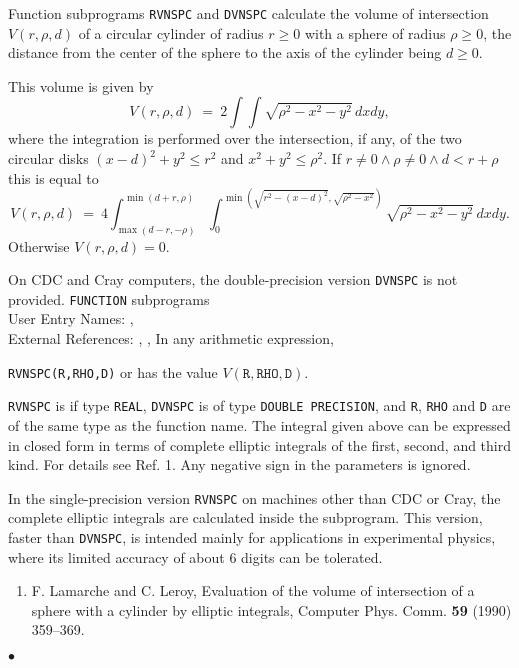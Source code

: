               
     
\Submitter{}                  
         \Revised{}
Function subprograms {\tt RVNSPC} and {\tt DVNSPC} calculate the volume
of intersection $V(r,\rho,d)$ of a circular cylinder of radius
$r \geq 0$ with a sphere of radius $\rho \geq 0$, the distance from
the center of the sphere to the axis of the cylinder being $d \geq 0$.
\par
This volume is given by
$$ V(r,\rho,d) \ = \ \displaystyle
2 \int\!\!\!\int \sqrt{\rho^2-x^2-y^2} \, dx dy, $$
where the integration is performed over the intersection, if any,
of the two circular disks $(x-d)^2 + y^2 \leq r^2$
and $x^2 + y^2 \leq \rho^2$.
If $r \neq 0 \wedge \rho \neq 0 \wedge d < r+\rho$ this is equal to
$$ V(r,\rho,d) \ = \ \displaystyle
4 \int_{\max(d-r,-\rho)}^{\min(d+r,\rho)}
\int_0^{\min \left( \sqrt{r^2-(x-d)^2},\sqrt{\rho^2-x^2} \right)}
\sqrt{\rho^2-x^2-y^2} \, dx dy. $$
Otherwise $V(r,\rho,d) = 0$.
\par
On CDC and Cray computers, the double-precision version {\tt DVNSPC}
is not provided.
\Structure
{\tt FUNCTION} subprograms \\
User Entry Names: ,   \\
External References: , , 
\Usage
In any arithmetic expression,
\begin{center}
{\tt RVNSPC(R,RHO,D)} \quad or  \quad
has the value \quad $V(\mathtt{R,RHO,D})$.
\end{center}
{\tt RVNSPC} is if type {\tt REAL}, {\tt DVNSPC} is of type
{\tt DOUBLE PRECISION}, and {\tt R}, {\tt RHO} and {\tt D} are of the
same type as the function name.
\Method
The integral given above can be expressed in closed form in terms of
complete elliptic integrals of the first, second, and third kind.
For details see Ref. 1.
\Notes
Any negative sign in the parameters is ignored.
\par
In the single-precision version {\tt RVNSPC} on machines other than
CDC or Cray, the complete elliptic integrals are calculated
inside the subprogram. This version, faster than {\tt DVNSPC},
is intended mainly for applications in experimental physics, where its
limited accuracy of about 6 digits can be tolerated.
\Refer
\begin{enumerate}
\item F. Lamarche and C. Leroy, Evaluation of the volume of intersection
of a sphere with a cylinder by elliptic integrals, Computer Phys. Comm.
{\bf 59} (1990) 359--369.
\end{enumerate}
$\bullet$
